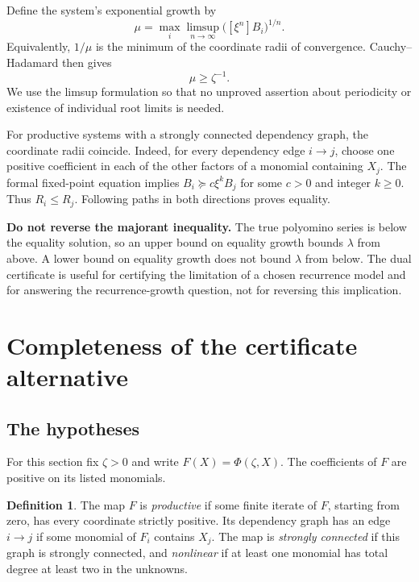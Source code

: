 \documentclass[11pt,a4paper]{article}
\theoremstyle{definition}
\newtheorem{definition}[theorem]{Definition}
\theoremstyle{remark}
\begin{document}
Define the system's exponential growth by
\[
 \mu=\max_i\limsup_{n\to\infty}\bigl([\xi^n]B_i\bigr)^{1/n}.
\]
Equivalently, $1/\mu$ is the minimum of the coordinate radii of convergence.
Cauchy--Hadamard then gives
\begin{equation}\label{kfp:eq:dual-growth}
 \mu\geq\zeta^{-1}.
\end{equation}
We use the limsup formulation so that no unproved assertion about periodicity
or existence of individual root limits is needed.

For productive systems with a strongly connected dependency graph, the
coordinate radii coincide. Indeed, for every dependency edge $i\to j$,
choose one positive coefficient in each of the other factors of a monomial
containing $X_j$. The formal fixed-point equation implies
$B_i\succeq c\xi^kB_j$ for some $c>0$ and integer $k\geq0$.
Thus $R_i\leq R_j$. Following paths in both directions proves equality.

\begin{resultbox}
\textbf{Do not reverse the majorant inequality.}
The true polyomino series is below the equality solution, so an upper bound
on equality growth bounds $\lambda$ from above. A lower bound on equality
growth does not bound $\lambda$ from below. The dual certificate is useful
for certifying the limitation of a chosen recurrence model and for answering
the recurrence-growth question, not for reversing this implication.
\end{resultbox}

\section{Completeness of the certificate alternative}
\label{kfp:sec:complete}

\subsection{The hypotheses}
For this section fix $\zeta>0$ and write $F(X)=\Phi(\zeta,X)$.
The coefficients of $F$ are positive on its listed monomials.

\begin{definition}
The map $F$ is \emph{productive} if some finite iterate of $F$, starting from
zero, has every coordinate strictly positive. Its dependency graph has an
edge $i\to j$ if some monomial of $F_i$ contains $X_j$.
The map is \emph{strongly connected} if this graph is strongly connected,
and \emph{nonlinear} if at least one monomial has total degree at least two
in the unknowns.
\end{definition}
\end{document}
